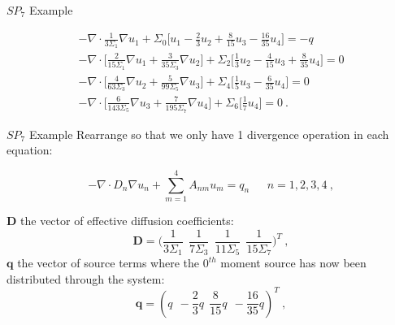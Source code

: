 \documentclass{beamer}
\begin{document}
\begin{frame}{$SP_7$ Example}

  \begin{subequations}
    \begin{gather}
      -\nabla \cdot \frac{1}{3 \Sigma_1} \nabla u_1 + \Sigma_0 \Bigg[
        u_1 - \frac{2}{3}u_2 + \frac{8}{15}u_3 - \frac{16}{35}u_4 \Bigg]
      = -q \\
      -\nabla \cdot \Bigg[ \frac{2}{15 \Sigma_1} \nabla u_1 +
        \frac{3}{35 \Sigma_3} \nabla u_2 \Bigg] + \Sigma_2 \Bigg[
        \frac{1}{3}u_2 - \frac{4}{15}u_3 + \frac{8}{35}u_4 \Bigg] = 0 \\
      -\nabla \cdot \Bigg[ \frac{4}{63 \Sigma_3} \nabla u_2 +
        \frac{5}{99 \Sigma_5} \nabla u_3 \Bigg] + \Sigma_4 \Bigg[
        \frac{1}{5}u_3 - \frac{6}{35}u_4 \Bigg] = 0 \\ 
      -\nabla \cdot \Bigg[ \frac{6}{143 \Sigma_5} \nabla u_3 +
        \frac{7}{195 \Sigma_7} \nabla u_4 \Bigg] + \Sigma_6 \Bigg[
        \frac{1}{7}u_4 \Bigg] = 0 \:.
    \end{gather}
    \label{eq:spn7_subs_equations}
  \end{subequations}

\end{frame}

\begin{frame}{$SP_7$ Example}
Rearrange so that we only have 1 divergence operation in each
equation:

\begin{equation}
  -\nabla \cdot D_n \nabla u_n + \sum_{m=1}^4 A_{nm} u_m =
  q_n\ \ \ \ \ \ \ n = 1,2,3,4\:,
  \label{eq:spn_matrix}
\end{equation}

$\mathbf{D}$ the vector of effective diffusion coefficients:
\begin{equation}
  \mathbf{D} = \Bigg( \frac{1}{3\Sigma_1}\ \ \frac{1}{7\Sigma_3}\ \
  \frac{1}{11\Sigma_5}\ \ \frac{1}{15\Sigma_7} \Bigg)^T\:,
  \label{eq:spn7_diffusion_coeffs}
\end{equation}
$\mathbf{q}$ the vector of source terms where the $0^{th}$ moment
source has now been distributed through the system:
\begin{equation}
  \mathbf{q} = (
  q\ \ -\frac{2}{3}q\ \ \frac{8}{15}q\ \ -\frac{16}{35}q )^T\:,
  \label{eq:spn7_source_vector}
\end{equation}

\end{frame}
\end{document}
